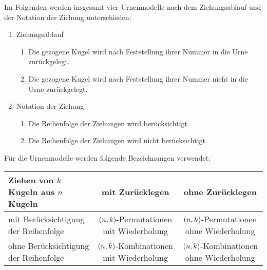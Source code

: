 \documentclass{lecture}
\begin{document}
    Im Folgenden werden insgesamt vier Urnenmodelle nach dem Ziehungsablauf und der Notation der Ziehung unterschieden:
    \begin{enumerate}[label=(\roman*)]
        \item Ziehungsablauf
        \begin{enumerate}[label=\alph*)]
            \item Die gezogene Kugel wird nach Feststellung ihrer Nummer in die Urne zurückgelegt.
            \item Die gezogene Kugel wird nach Feststellung ihrer Nummer nicht in die Urne zurückgelegt.
        \end{enumerate}
        \item Notation der Ziehung
        \begin{enumerate}[label=\alph*)]
            \item Die Reihenfolge der Ziehungen wird berücksichtigt.
            \item Die Reihenfolge der Ziehungen wird nicht berücksichtigt.
        \end{enumerate}
    \end{enumerate}
    Für die Urnenmodelle werden folgende Bezeichnungen verwendet.
    \begin{center}
        \begin{tabular}{l|cc}
            \toprule
            \makecell[l]{Ziehen von \(k\) Kugeln\\aus \(n\) Kugeln} & mit Zurücklegen & ohne Zurücklegen\\
            \midrule
            \makecell[l]{mit Berücksichtigung\\der Reihenfolge} & \makecell{\(\parentheses*{n, k}\)-Permutationen\\mit Wiederholung} & \makecell{\(\parentheses*{n, k}\)-Permutationen\\ohne Wiederholung}\\
            \makecell[l]{ohne Berücksichtigung\\der Reihenfolge} & \makecell{\(\parentheses*{n, k}\)-Kombinationen\\mit Wiederholung} & \makecell{\(\parentheses*{n, k}\)-Kombinationen\\ohne Wiederholung}\\
            \bottomrule
        \end{tabular}
    \end{center}
\end{document}

